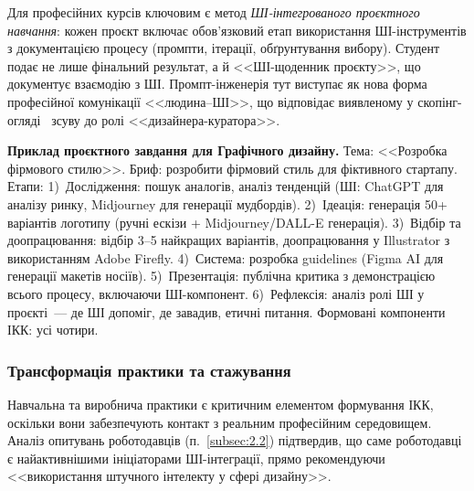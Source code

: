 Для професійних курсів ключовим є метод \textit{ШІ-інтегрованого проєктного навчання}: кожен проєкт включає обов'язковий етап використання ШІ-інструментів з документацією процесу (промпти, ітерації, обґрунтування вибору). Студент подає не лише фінальний результат, а й <<ШІ-щоденник проєкту>>, що документує взаємодію з ШІ. Промпт-інженерія тут виступає як нова форма професійної комунікації <<людина--ШІ>>, що відповідає виявленому у скопінг-огляді~\cite{Musiienko2026ScopingReview} зсуву до ролі <<дизайнера-куратора>>.

\textbf{Приклад проєктного завдання для Графічного дизайну.} Тема: <<Розробка фірмового стилю>>. Бриф: розробити фірмовий стиль для фіктивного стартапу. Етапи: 1)~Дослідження: пошук аналогів, аналіз тенденцій (ШІ: ChatGPT для аналізу ринку, Midjourney для генерації мудбордів). 2)~Ідеація: генерація 50+ варіантів логотипу (ручні ескізи + Midjourney/DALL-E генерація). 3)~Відбір та доопрацювання: відбір 3--5 найкращих варіантів, доопрацювання у Illustrator з використанням Adobe Firefly. 4)~Система: розробка guidelines (Figma AI для генерації макетів носіїв). 5)~Презентація: публічна критика з демонстрацією всього процесу, включаючи ШІ-компонент. 6)~Рефлексія: аналіз ролі ШІ у проєкті~--- де ШІ допоміг, де завадив, етичні питання. Формовані компоненти ІКК: усі чотири.

\subsubsection{Трансформація практики та стажування}\label{sssec:3.2.6}

Навчальна та виробнича практики є критичним елементом формування ІКК, оскільки вони забезпечують контакт з реальним професійним середовищем. Аналіз опитувань роботодавців (п.~\ref{subsec:2.2}) підтвердив, що саме роботодавці є найактивнішими ініціаторами ШІ-інтеграції, прямо рекомендуючи <<використання штучного інтелекту у сфері дизайну>>.

